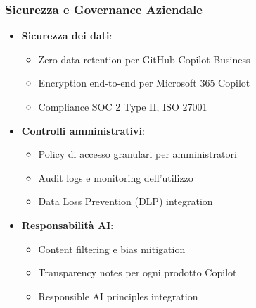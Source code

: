 \documentclass[aspectratio=169]{beamer}
\begin{document}
\begin{frame}
\frametitle{Sicurezza e Governance Aziendale}
\begin{itemize}
    \item \textbf{Sicurezza dei dati}:
    \begin{itemize}
        \item Zero data retention per GitHub Copilot Business
        \item Encryption end-to-end per Microsoft 365 Copilot
        \item Compliance SOC 2 Type II, ISO 27001
    \end{itemize}
    \item \textbf{Controlli amministrativi}:
    \begin{itemize}
        \item Policy di accesso granulari per amministratori
        \item Audit logs e monitoring dell'utilizzo
        \item Data Loss Prevention (DLP) integration
    \end{itemize}
    \item \textbf{Responsabilità AI}:
    \begin{itemize}
        \item Content filtering e bias mitigation
        \item Transparency notes per ogni prodotto Copilot
        \item Responsible AI principles integration
    \end{itemize}
\end{itemize}
\end{frame}
%
%
\end{document}

